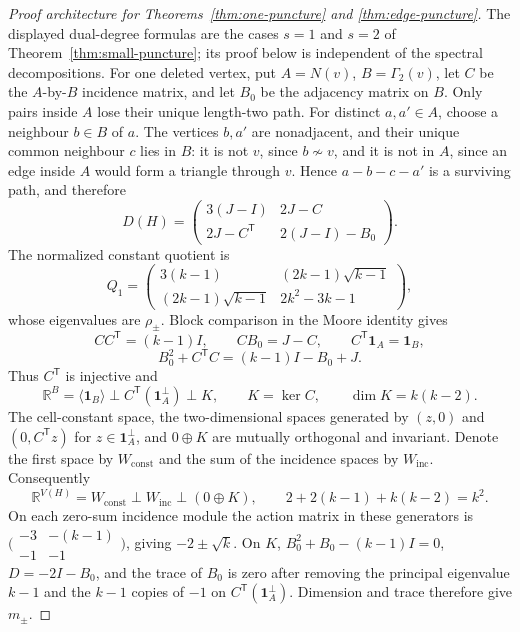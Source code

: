 \documentclass[a4paper,10pt,reqno]{amsart}
\theoremstyle{plain}
\theoremstyle{definition}
\theoremstyle{remark}
\newcommand{\one}{\mathbf 1}
\begin{document}
\begin{proof}[Proof architecture for Theorems~\ref{thm:one-puncture} and
\ref{thm:edge-puncture}]
The displayed dual-degree formulas are the cases \(s=1\) and \(s=2\) of
Theorem~\ref{thm:small-puncture}; its proof below is independent of the
spectral decompositions.  For one deleted vertex, put \(A=N(v)\),
\(B=\Gamma_2(v)\), let \(C\) be
the \(A\)-by-\(B\) incidence matrix, and let \(B_0\) be the adjacency
matrix on \(B\).  Only pairs inside \(A\) lose their unique length-two path.
For distinct \(a,a'\in A\), choose a neighbour \(b\in B\) of \(a\).  The
vertices \(b,a'\) are nonadjacent, and their unique common neighbour \(c\)
lies in \(B\): it is not \(v\), since \(b\not\sim v\), and it is not in
\(A\), since an edge inside \(A\) would form a triangle through \(v\).
Hence \(a-b-c-a'\) is a surviving path, and therefore
\[
 D(H)=\begin{pmatrix}3(J-I)&2J-C\\2J-C^{\mathsf T}&2(J-I)-B_0\end{pmatrix}.
\]
The normalized constant quotient is
\[
 Q_1=\begin{pmatrix}
 3(k-1)&(2k-1)\sqrt{k-1}\\
 (2k-1)\sqrt{k-1}&2k^2-3k-1
 \end{pmatrix},
\]
whose eigenvalues are \(\rho_\pm\).  Block comparison in the Moore identity
gives
\[
 CC^{\mathsf T}=(k-1)I,\qquad
 CB_0=J-C,\qquad
 C^{\mathsf T}\one_A=\one_B,
\]
\[
 B_0^2+C^{\mathsf T}C=(k-1)I-B_0+J.
\]
Thus \(C^{\mathsf T}\) is injective and
\[
 \mathbb R^B=
 \langle\one_B\rangle\perp
 C^{\mathsf T}(\one_A^\perp)\perp K,
 \qquad K=\ker C,\qquad \dim K=k(k-2).
\]
The cell-constant space, the two-dimensional spaces generated by
\((z,0)\) and \((0,C^{\mathsf T}z)\) for \(z\in\one_A^\perp\), and
\(0\oplus K\) are mutually orthogonal and invariant.  Denote the first space
by \(W_{\mathrm{const}}\) and the sum of the incidence spaces by
\(W_{\mathrm{inc}}\).  Consequently
\[
\mathbb R^{V(H)}=W_{\mathrm{const}}\perp W_{\mathrm{inc}}\perp(0\oplus K),
 \qquad 2+2(k-1)+k(k-2)=k^2.
\]
On each zero-sum incidence module the action matrix in these generators is
\(\bigl(\begin{smallmatrix}-3&-(k-1)\\-1&-1\end{smallmatrix}\bigr)\),
giving \(-2\pm\sqrt{k}\).  On \(K\),
\(B_0^2+B_0-(k-1)I=0\), \(D=-2I-B_0\), and the trace of \(B_0\) is
zero after removing the principal eigenvalue \(k-1\) and the \(k-1\)
copies of \(-1\) on \(C^{\mathsf T}(\one_A^\perp)\).  Dimension and trace
therefore give \(m_\pm\).


\end{proof}
\end{document}
